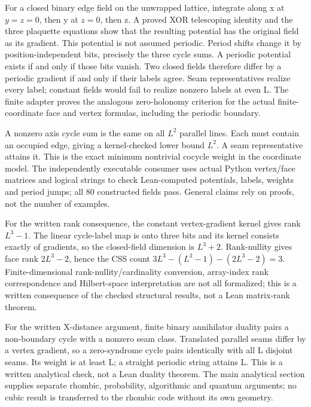For a closed binary edge field on the unwrapped lattice, integrate along x at $y=z=0$, then y at $z=0$, then z. A proved XOR telescoping identity and the three plaquette equations show that the resulting potential has the original field as its gradient. This potential is not assumed periodic. Period shifts change it by position-independent bits, precisely the three cycle sums. A periodic potential exists if and only if those bits vanish. Two closed fields therefore differ by a periodic gradient if and only if their labels agree. Seam representatives realize every label; constant fields would fail to realize nonzero labels at even L. The finite adapter proves the analogous zero-holonomy criterion for the actual finite-coordinate face and vertex formulas, including the periodic boundary.

A nonzero axis cycle sum is the same on all $L^2$ parallel lines. Each must contain an occupied edge, giving a kernel-checked lower bound $L^2$. A seam representative attains it. This is the exact minimum nontrivial cocycle weight in the coordinate model. The independently executable consumer uses actual Python vertex/face matrices and logical strings to check Lean-computed potentials, labels, weights and period jumps; all 80 constructed fields pass. General claims rely on proofs, not the number of examples.

For the written rank consequence, the constant vertex-gradient kernel gives rank $L^3-1$. The linear cycle-label map is onto three bits and its kernel consists exactly of gradients, so the closed-field dimension is $L^3+2$. Rank-nullity gives face rank $2L^3-2$, hence the CSS count $3L^3-(L^3-1)-(2L^3-2)=3$. Finite-dimensional rank-nullity/cardinality conversion, array-index rank correspondence and Hilbert-space interpretation are not all formalized; this is a written consequence of the checked structural results, not a Lean matrix-rank theorem.

For the written X-distance argument, finite binary annihilator duality pairs a non-boundary cycle with a nonzero seam class. Translated parallel seams differ by a vertex gradient, so a zero-syndrome cycle pairs identically with all L disjoint seams. Its weight is at least L; a straight periodic string attains L. This is a written analytical check, not a Lean duality theorem. The main analytical section supplies separate rhombic, probability, algorithmic and quantum arguments; no cubic result is transferred to the rhombic code without its own geometry.



